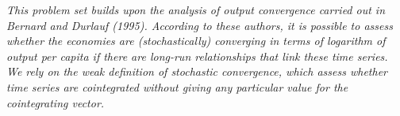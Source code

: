 \textit{This problem set builds upon the analysis of output convergence carried out in Bernard and Durlauf
(1995). According to these authors, it is possible to assess whether the economies are (stochastically)
converging in terms of logarithm of output per capita if there are long-run relationships that link these
time series. We rely on the weak definition of stochastic convergence, which assess whether time series
are cointegrated without giving any particular value for the cointegrating vector.}
